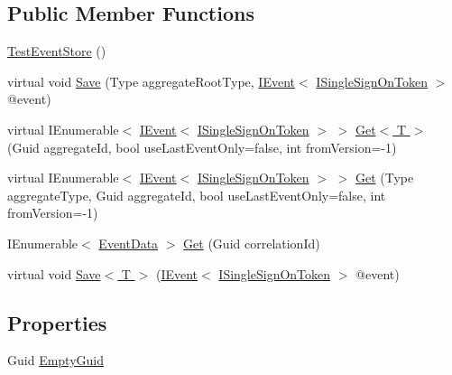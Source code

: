 \subsection*{Public Member Functions}
\begin{DoxyCompactItemize}
\item 
\hyperlink{classCqrs_1_1Tests_1_1Substitutes_1_1TestEventStore_a2687a0520b45af4fcf1e9083f42c194b}{Test\+Event\+Store} ()
\item 
virtual void \hyperlink{classCqrs_1_1Tests_1_1Substitutes_1_1TestEventStore_ac5f756c50e6af8df69313cd24f1c69f5}{Save} (Type aggregate\+Root\+Type, \hyperlink{interfaceCqrs_1_1Events_1_1IEvent}{I\+Event}$<$ \hyperlink{interfaceCqrs_1_1Authentication_1_1ISingleSignOnToken}{I\+Single\+Sign\+On\+Token} $>$ @event)
\item 
virtual I\+Enumerable$<$ \hyperlink{interfaceCqrs_1_1Events_1_1IEvent}{I\+Event}$<$ \hyperlink{interfaceCqrs_1_1Authentication_1_1ISingleSignOnToken}{I\+Single\+Sign\+On\+Token} $>$ $>$ \hyperlink{classCqrs_1_1Tests_1_1Substitutes_1_1TestEventStore_a3cbf3e72012e13320cf4d9bb47e9face}{Get$<$ T $>$} (Guid aggregate\+Id, bool use\+Last\+Event\+Only=false, int from\+Version=-\/1)
\item 
virtual I\+Enumerable$<$ \hyperlink{interfaceCqrs_1_1Events_1_1IEvent}{I\+Event}$<$ \hyperlink{interfaceCqrs_1_1Authentication_1_1ISingleSignOnToken}{I\+Single\+Sign\+On\+Token} $>$ $>$ \hyperlink{classCqrs_1_1Tests_1_1Substitutes_1_1TestEventStore_a58e89fab7fdfafff88c62317b6765e55}{Get} (Type aggregate\+Type, Guid aggregate\+Id, bool use\+Last\+Event\+Only=false, int from\+Version=-\/1)
\item 
I\+Enumerable$<$ \hyperlink{classCqrs_1_1Events_1_1EventData}{Event\+Data} $>$ \hyperlink{classCqrs_1_1Tests_1_1Substitutes_1_1TestEventStore_afde308e712368690629564a1001928e6}{Get} (Guid correlation\+Id)
\item 
virtual void \hyperlink{classCqrs_1_1Tests_1_1Substitutes_1_1TestEventStore_ab727c96e0f9a36729c1e10fabbef969f}{Save$<$ T $>$} (\hyperlink{interfaceCqrs_1_1Events_1_1IEvent}{I\+Event}$<$ \hyperlink{interfaceCqrs_1_1Authentication_1_1ISingleSignOnToken}{I\+Single\+Sign\+On\+Token} $>$ @event)
\end{DoxyCompactItemize}
\subsection*{Properties}
\begin{DoxyCompactItemize}
\item 
Guid \hyperlink{classCqrs_1_1Tests_1_1Substitutes_1_1TestEventStore_a04a613fcd8715c1d053efcb303c06565}{Empty\+Guid}
\end{DoxyCompactItemize}


